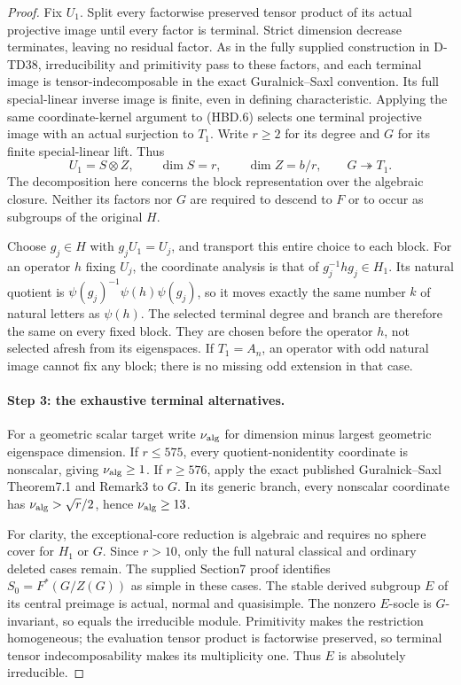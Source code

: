 \begin{proof}
Fix $U_1$.  Split every factorwise preserved tensor product of
its actual projective image until every factor is terminal.
Strict dimension decrease terminates, leaving no residual factor.
As in the fully supplied construction in D-TD38, irreducibility
and primitivity pass to these factors, and each terminal image
is tensor-indecomposable in the exact Guralnick--Saxl convention.
Its full special-linear inverse image is finite, even in defining
characteristic.  Applying the same coordinate-kernel argument to
(HBD.6) selects one terminal projective image with an actual
surjection to $T_1$.  Write $r\ge2$ for its degree and $G$ for
its finite special-linear lift.  Thus
\[
 U_1=S\otimes Z,\qquad \dim S=r,\qquad \dim Z=b/r,
 \qquad G\twoheadrightarrow T_1.
 \tag{HBD.7}
\]
The decomposition here concerns the block representation over
the algebraic closure.  Neither its factors nor $G$ are required
to descend to $F$ or to occur as subgroups of the original $H$.

Choose $g_j\in H$ with $g_jU_1=U_j$, and transport this entire
choice to each block.  For an operator $h$ fixing $U_j$, the
coordinate analysis is that of $g_j^{-1}hg_j\in H_1$.
Its natural quotient is
$\psi(g_j)^{-1}\psi(h)\psi(g_j)$, so it moves exactly the
same number $k$ of natural letters as $\psi(h)$.
The selected terminal degree and branch are therefore the same
on every fixed block.  They are chosen before the operator $h$,
not selected afresh from its eigenspaces.  If $T_1=A_n$, an
operator with odd natural image cannot fix any block; there is
no missing odd extension in that case.

\paragraph{Step 3: the exhaustive terminal alternatives.}
For a geometric scalar target write $\nu_{\rm alg}$ for
dimension minus largest geometric eigenspace dimension.
If $r\le575$, every quotient-nonidentity coordinate is
nonscalar, giving $\nu_{\rm alg}\ge1$.
If $r\ge576$, apply the exact published Guralnick--Saxl
Theorem7.1 and Remark3 to $G$.\cite{BI:GS}
In its generic branch, every nonscalar coordinate has
$\nu_{\rm alg}>\sqrt r/2$, hence $\nu_{\rm alg}\ge13$.

For clarity, the exceptional-core reduction is algebraic and
requires no sphere cover for $H_1$ or $G$.  Since $r>10$, only
the full natural classical and ordinary deleted cases remain.
The supplied Section7 proof identifies
$S_0=F^*(G/Z(G))$ as simple in these cases.  The stable derived
subgroup $E$ of its central preimage is actual, normal and
quasisimple.  The nonzero $E$-socle is $G$-invariant, so equals
the irreducible module.  Primitivity makes the restriction
homogeneous; the evaluation tensor product is factorwise
preserved, so terminal tensor indecomposability makes its
multiplicity one.  Thus $E$ is absolutely irreducible.


\end{proof}
